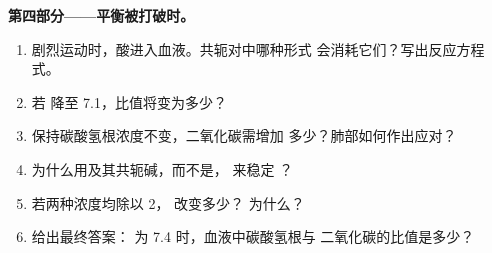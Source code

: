 \begin{problem}
\medskip
\noindent\textbf{第四部分——平衡被打破时。}
\begin{enumerate}[resume]
  \item 剧烈运动时，酸进入血液。共轭对中哪种形式
        会消耗它们？写出反应方程式。
  \item 若  降至 7.1，比值将变为多少？
  \item 保持碳酸氢根浓度不变，二氧化碳需增加
        多少？肺部如何作出应对？
  \item 为什么用及其共轭碱，而不是，
        来稳定 ？
  \item 若两种浓度均除以 2， 改变多少？
        为什么？
  \item 给出最终答案： 为 7.4 时，血液中碳酸氢根与
        二氧化碳的比值是多少？
\end{enumerate}
\end{problem}
